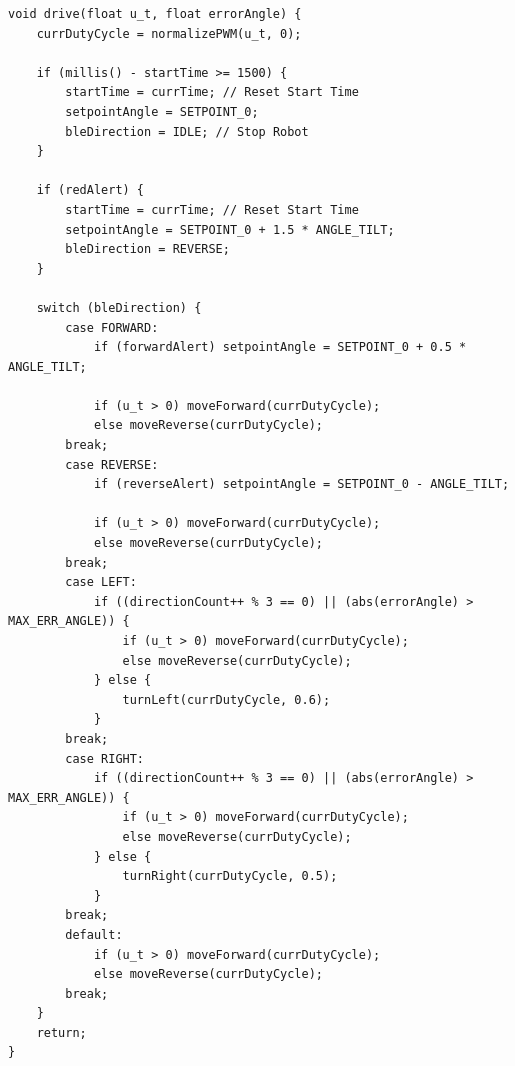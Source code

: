 \documentclass{article}
\begin{document}
\begin{lstlisting}[caption={Source Code : Arduino Movement Statemachine}, label={lst:arduino_movement_code}]
void drive(float u_t, float errorAngle) {
    currDutyCycle = normalizePWM(u_t, 0);

    if (millis() - startTime >= 1500) {
        startTime = currTime; // Reset Start Time
        setpointAngle = SETPOINT_0;
        bleDirection = IDLE; // Stop Robot
    }

    if (redAlert) {
        startTime = currTime; // Reset Start Time
        setpointAngle = SETPOINT_0 + 1.5 * ANGLE_TILT;
        bleDirection = REVERSE;
    }

    switch (bleDirection) {
        case FORWARD:
            if (forwardAlert) setpointAngle = SETPOINT_0 + 0.5 * ANGLE_TILT;

            if (u_t > 0) moveForward(currDutyCycle);
            else moveReverse(currDutyCycle);
        break;
        case REVERSE:
            if (reverseAlert) setpointAngle = SETPOINT_0 - ANGLE_TILT;

            if (u_t > 0) moveForward(currDutyCycle);
            else moveReverse(currDutyCycle);
        break;
        case LEFT:
            if ((directionCount++ % 3 == 0) || (abs(errorAngle) > MAX_ERR_ANGLE)) {
                if (u_t > 0) moveForward(currDutyCycle);
                else moveReverse(currDutyCycle);
            } else {
                turnLeft(currDutyCycle, 0.6);
            }
        break;
        case RIGHT:
            if ((directionCount++ % 3 == 0) || (abs(errorAngle) > MAX_ERR_ANGLE)) {
                if (u_t > 0) moveForward(currDutyCycle);
                else moveReverse(currDutyCycle);
            } else {
                turnRight(currDutyCycle, 0.5);
            }
        break;
        default:
            if (u_t > 0) moveForward(currDutyCycle);
            else moveReverse(currDutyCycle);
        break;
    }
    return;
}
\end{lstlisting}
\end{document}
